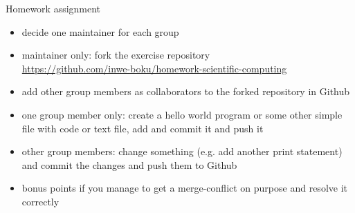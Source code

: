 \begin{frame}[fragile]{Homework assignment}
    \begin{itemize}
        \item decide one maintainer for each group
        \item maintainer only: fork the exercise repository\\
            \href{https://github.com/inwe-boku/homework-scientific-computing}{https://github.com/inwe-boku/homework-scientific-computing}
        \item add other group members as collaborators to the forked repository in Github
        \item one group member only: create a hello world program or some other simple file with
            code or text file, add and commit it and push it
        \item other group members: change something (e.g. add another print statement) and commit
          the changes and push them to Github
        \item bonus points if you manage to get a merge-conflict on purpose and resolve it correctly
    \end{itemize}
\end{frame}


